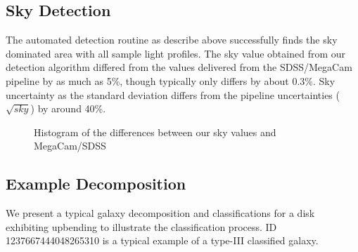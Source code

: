 


\subsection{Sky Detection} %
\label{sub:sky_detection}
The automated detection routine as describe above successfully finds the sky dominated area with all sample light profiles. The sky value obtained from our detection algorithm differed from the values delivered from the SDSS/MegaCam pipeline by as much as 5\%, though typically only differs by about 0.3\%.  Sky uncertainty as the standard deviation differs from the pipeline uncertainties ($\sqrt{sky}$) by around 40\%. 
\begin{figure}[h]
	\centering
	\caption{\footnotesize{Histogram of the differences between our sky values and MegaCam/SDSS}}
\end{figure}



\subsection{Example Decomposition} %
\label{sub:example_decompositions}
We present a typical galaxy decomposition and classifications for a disk exhibiting upbending to illustrate the classification process. ID 1237667444048265310 is a typical example of a type-III classified galaxy.

